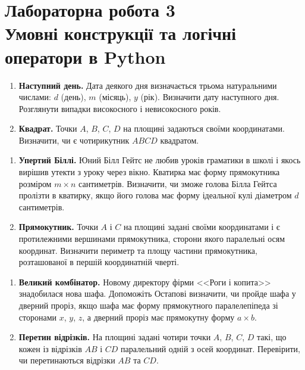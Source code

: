 
\chapter {Лабораторна робота 3\\ Умовні конструкції та логічні оператори в Python}

	
	
	{\large
		\begin{enumerate}
			\item \textbf{Наступний день.} Дата деякого дня визначається трьома натуральними числами: $d$ (день), $m$ (місяць), $y$ (рік). Визначити дату наступного дня. Розглянути випадки високосного і невисокосного років.
			\item \textbf{Квадрат.} Точки $A$, $B$, $C$, $D$ на площині задаються своїми координатами. Визначити, чи є чотирикутник $ABCD$ квадратом.
		\end{enumerate}
	}
	
	
	\vspace{1cm}
	
	{\large
		\begin{enumerate}
			\item \textbf{Упертий Біллі.} Юний Білл Гейтс не любив уроків граматики в школі і якось вирішив утекти з уроку через вікно. Кватирка має форму прямокутника розміром $m\times n$ сантиметрів. Визначити, чи зможе голова Білла Гейтса пролізти в кватирку, якщо його голова має форму ідеальної кулі діаметром $d$ сантиметрів.
			\item \textbf{Прямокутник.} Точки $A$ і $C$ на площині задані своїми координатами і є про\-ти\-леж\-ни\-ми вершинами прямокутника, сторони якого паралельні осям координат. Визначити периметр та площу частини прямокутника, розташованої в першій координатній чверті.
		\end{enumerate}
	}
	
	
	
	
	{\large
		\begin{enumerate}
			\item \textbf{Великий комбінатор.} Новому директору фірми <<Роги і копита>> знадобилася нова шафа. Допоможіть Остапові визначити, чи пройде шафа у дверний проріз, якщо шафа має форму прямокутного паралелепіпеда зі сторонами $x$, $y$, $z$, а дверний проріз має прямокутну форму $a\times b$.
			\item \textbf{Перетин відрізків.} На площині задані чотири точки $A$, $B$, $C$, $D$ такі, що кожен із відрізків $AB$ і $CD$ паралельний одній з осей координат. Перевірити, чи перетинаються відрізки $AB$ та $CD$.
		\end{enumerate}
	}
	\vspace{0.5cm}
	
